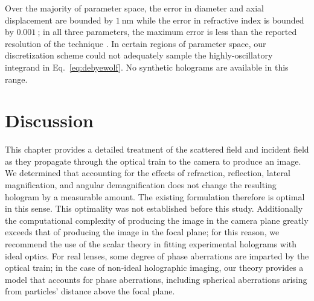 Over the majority of parameter space, the error in diameter and
axial displacement are bounded by $\SI{1}{\nm}$ while the error
in refractive index is bounded by $\SI{0.001}{}$; in all three
parameters, the maximum error is less than the reported resolution of
the technique \cite{krishnatreya14}. In certain regions of parameter
space, our discretization scheme could not adequately sample the
highly-oscillatory integrand in Eq.~\eqref{eq:debyewolf}.
No synthetic holograms are available in this range.

\section{Discussion}

This chapter provides a detailed treatment of the scattered field
and incident field as they propagate through the optical train to the camera
to produce an image.
We determined that accounting for
the effects of refraction, reflection, lateral magnification, and angular
demagnification does not change the resulting hologram by a measurable amount.
The existing formulation therefore is optimal in this sense. This optimality
was not established before this study. Additionally
the computational complexity of producing
the image in the camera plane greatly exceeds that of producing the
image in the focal plane; for this reason, we recommend the use of the
scalar theory in fitting experimental holograms with ideal optics.
For real lenses, some degree of phase aberrations are imparted by
the optical train; in the case of non-ideal holographic imaging,
our theory provides a model that accounts for phase aberrations,
including spherical aberrations arising from particles' distance
above the focal plane.
